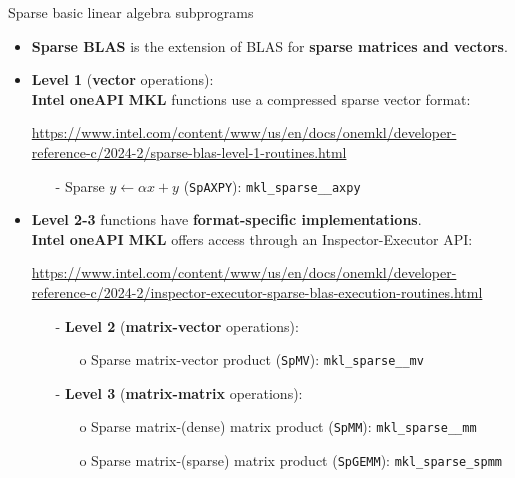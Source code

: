 \documentclass[t,usepdftitle=false]{beamer}
\begin{document}
\begin{frame}{Sparse basic linear algebra subprograms}
\begin{itemize}
\item \textbf{Sparse BLAS} is the extension of BLAS for \textbf{sparse matrices and vectors}.\vspace{.03cm}
\item \textbf{Level 1} (\textbf{vector} operations):\vspace{.05cm}\\
\textbf{Intel oneAPI MKL} functions use a compressed sparse vector format:\\
\begin{center}\small
\url{https://www.intel.com/content/www/us/en/docs/onemkl/developer-reference-c/2024-2/sparse-blas-level-1-routines.html}
\end{center}
\begin{itemize}\normalsize
\item[-] Sparse $y\leftarrow\alpha x+y$ (\texttt{SpAXPY}): \texttt{mkl\_sparse\_{\color{blue}{x}}\_axpy}\vspace{.03cm}
\end{itemize}
\item \textbf{Level 2-3} functions have \textbf{format-specific implementations}.\vspace{.05cm}\\
\textbf{Intel oneAPI MKL} offers access through an Inspector-Executor API:
\begin{center}\small
\url{https://www.intel.com/content/www/us/en/docs/onemkl/developer-reference-c/2024-2/inspector-executor-sparse-blas-execution-routines.html}
\end{center}
\begin{itemize}\normalsize
\item[-] \textbf{Level 2} (\textbf{matrix-vector} operations):
\begin{itemize}\normalsize
\item[o] Sparse matrix-vector product (\texttt{SpMV}): \texttt{mkl\_sparse\_{\color{blue}{x}}\_mv}\vspace{.03cm}
\end{itemize}
\item[-] \textbf{Level 3} (\textbf{matrix-matrix} operations):
\begin{itemize}\normalsize
\item[o] Sparse matrix-(dense) matrix product (\texttt{SpMM}): \texttt{mkl\_sparse\_{\color{blue}{x}}\_mm}\vspace{.03cm}
\item[o] Sparse matrix-(sparse) matrix product (\texttt{SpGEMM}): \texttt{mkl\_sparse\_spmm}
\end{itemize}
\end{itemize}
\end{itemize}


\end{frame}
\end{document}
